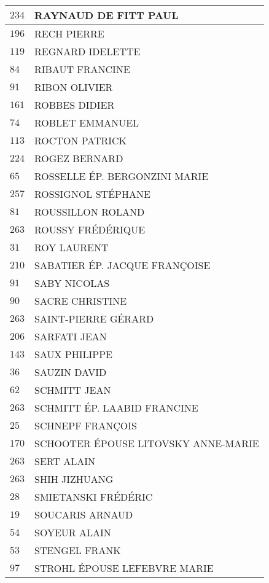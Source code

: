 \begin{xltabular}{\linewidth}{|l|X|}
    \hline
    $234$ & RAYNAUD DE FITT PAUL \\
    \hline
    $196$ & RECH PIERRE \\
    \hline
    $119$ & REGNARD IDELETTE \\
    \hline
    $84$ & RIBAUT FRANCINE \\
    \hline
    $91$ & RIBON OLIVIER \\
    \hline
    $161$ & ROBBES DIDIER \\
    \hline
    $74$ & ROBLET EMMANUEL \\
    \hline
    $113$ & ROCTON PATRICK \\
    \hline
    $224$ & ROGEZ BERNARD \\
    \hline
    $65$ & ROSSELLE ÉP. BERGONZINI MARIE \\
    \hline
    $257$ & ROSSIGNOL STÉPHANE \\
    \hline
    $81$ & ROUSSILLON ROLAND \\
    \hline
    $263$ & ROUSSY FRÉDÉRIQUE \\
    \hline
    $31$ & ROY LAURENT \\
    \hline
    $210$ & SABATIER ÉP. JACQUE FRANÇOISE \\
    \hline
    $91$ & SABY NICOLAS \\
    \hline
    $90$ & SACRE CHRISTINE \\
    \hline
    $263$ & SAINT-PIERRE GÉRARD \\
    \hline
    $206$ & SARFATI JEAN \\
    \hline
    $143$ & SAUX PHILIPPE \\
    \hline
    $36$ & SAUZIN DAVID \\
    \hline
    $62$ & SCHMITT JEAN \\
    \hline
    $263$ & SCHMITT ÉP. LAABID FRANCINE \\
    \hline
    $25$ & SCHNEPF FRANÇOIS \\
    \hline
    $170$ & SCHOOTER ÉPOUSE LITOVSKY ANNE-MARIE \\
    \hline
    $263$ & SERT ALAIN \\
    \hline
    $263$ & SHIH JIZHUANG \\
    \hline
    $28$ & SMIETANSKI FRÉDÉRIC \\
    \hline
    $19$ & SOUCARIS ARNAUD \\
    \hline
    $54$ & SOYEUR ALAIN \\
    \hline
    $53$ & STENGEL FRANK \\
    \hline
    $97$ & STROHL ÉPOUSE LEFEBVRE MARIE \\

\end{xltabular}
